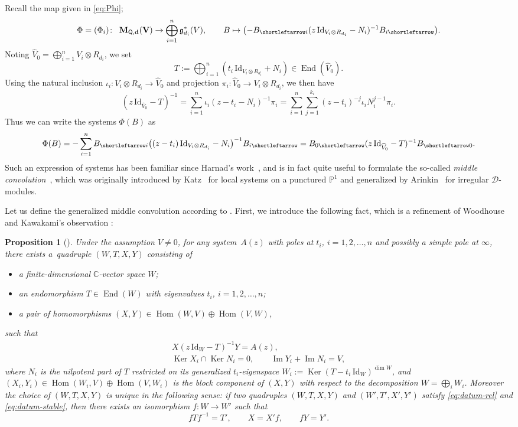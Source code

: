 \documentclass[pdftex]{sigma}
\newcommand{\slar}{\shortleftarrow}
\newenvironment{itm}%
{\begin{itemize}
\setlength{\itemsep}{0em}
}%
{\end{itemize}}
\numberwithin{equation}{section}
\newtheorem{Proposition}[Theorem]{Proposition}
\theoremstyle{definition}
\newcommand{\C}{\mathbb{C}} %
\newcommand{\bbP}{\mathbb{P}} %
\newcommand{\g}{\mathfrak{g}} %
\newcommand{\End}{\operatorname{End}}
\newcommand{\Hom}{\operatorname{Hom}}
\newcommand{\Ker}{\operatorname{Ker}}
\newcommand{\range}{\operatorname{Im}}
\newcommand{\unit}{\mathrm{Id}}
\newcommand{\bM}{\operatorname{\mathbf{M}}}
\newcommand{\bV}{\mathbf{V}}
\newcommand{\ved}{\mathbf{d}}
\newcommand{\QQ}{\mathsf{Q}} %
\begin{document}
Recall the map given in \eqref{eq:Phi};
\[
\Phi=(\Phi_i) \colon \ \bM_{\QQ,\ved}(\bV)
\to \bigoplus_{i=1}^n \g^*_{d_i}(V), \qquad
B \mapsto
\bigl( -B_{\slar i} (z\,\unit_{V_i \otimes R_{d_i}} - N_i)^{-1} B_{i \slar} \bigr).
\]
Noting $\widehat{V}_0=\bigoplus_{i=1}^n V_i\otimes R_{d_i}$, we set
\[
T := \bigoplus_{i=1}^n (t_i\,\unit_{V_i \otimes R_{d_i}} + N_i)
\in \End(\widehat{V}_0).
\]
Using the natural inclusion
$\iota_i \colon V_i \otimes R_{d_i} \to \widehat{V}_0$ and
projection
$\pi_i \colon \widehat{V}_0 \to V_i \otimes R_{d_i}$,
we then have
\[
(z\,\unit_{\widehat{V}_0} - T)^{-1}
= \sum_{i=1}^n \iota_i (z-t_i-N_i)^{-1} \pi_i
= \sum_{i=1}^n \sum_{j=1}^{k_i} (z-t_i)^{-j} \iota_i N_i^{j-1} \pi_i.
\]
Thus we can write the systems $\Phi(B)$ as
\begin{gather}\label{eq:AHP}
\Phi(B)=-\sum_{i=1}^n B_{\slar i}
\bigl( (z-t_i)\,\unit_{V_i \otimes R_{d_i}} - N_i \bigr)^{-1} B_{i \slar}
=B_{0 \slar} (z\,\unit_{\widehat{V}_0} - T)^{-1}B_{\slar 0}.
\end{gather}
Such an expression of systems has been familiar since
Harnad's work~\cite{MR1309553},
and is in fact quite useful to formulate
the so-called {\em middle convolution}~\cite{0911.3863},
which was originally introduced by Katz~\cite{MR1366651}
for local systems on a punctured $\bbP^1$
and generalized by Arinkin~\cite{0808.0699}
for irregular $\mathscr{D}$-modules.

Let us def\/ine the generalized middle convolution according
to \cite{0911.3863}.
First, we introduce the following fact, which is a ref\/inement of
Woodhouse and Kawakami's observation \cite{MR2287297,kawakami}:
\begin{Proposition}[{\cite[Propositions~1~and~2]{0911.3863}}]\label{prop:datum}
Under the assumption $V \neq 0$,
for any system~$A(z)$
with poles at $t_i$, $i=1,2,\dots ,n$ and possibly a simple pole at $\infty$,
there exists a~quadruple $(W,T,X,Y)$ consisting of
\begin{itm}
\item a finite-dimensional $\C$-vector space $W$;
\item an endomorphism $T \in \End(W)$ with eigenvalues $t_i$, $i=1,2,\dots ,n$;
\item a pair of homomorphisms $(X,Y) \in \Hom(W,V) \oplus \Hom(V,W)$,
\end{itm}
such that
\begin{gather}
X(z\,\unit_W -T)^{-1}Y=A(z), \label{eq:datum-rel}\\
\Ker X_i \cap \Ker N_i =0, \qquad
\range Y_i + \range N_i =V, \label{eq:datum-stable}
\end{gather}
where $N_i$ is the nilpotent part of $T$ restricted on its
generalized $t_i$-eigenspace $W_i := \Ker (T-t_i\,\unit_W)^{\dim W}$,
and $(X_i,Y_i) \in \Hom(W_i,V)\oplus \Hom(V,W_i)$ is the block component
of $(X,Y)$ with respect to the decomposition $W=\bigoplus_i W_i$.
Moreover the choice of $(W,T,X,Y)$
is unique in the following sense: if two quadruples $(W,T,X,Y)$ and
$(W',T',X',Y')$ satisfy \eqref{eq:datum-rel} and \eqref{eq:datum-stable}, then
there exists an isomorphism $f \colon W \to W'$ such that
\[
fTf^{-1}=T', \qquad X = X' f, \qquad f Y = Y'.
\]
\end{Proposition}
\end{document}
